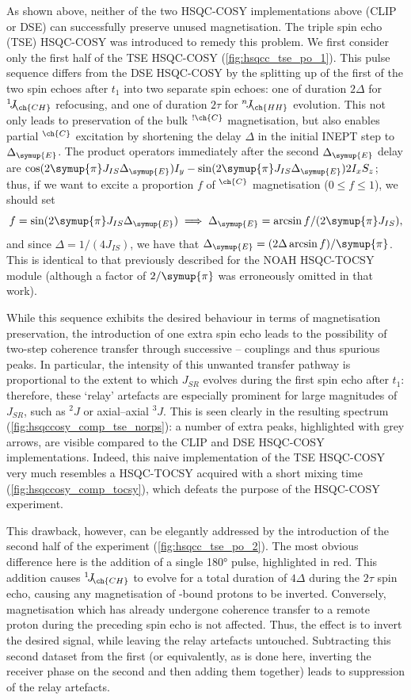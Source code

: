 \documentclass[a4paper,12pt]{article}
\newcommand{\proton}{\ch{^{1}H}}
\newcommand{\carbon}{\ch{^{13}C}}
\newcommand{\DeltaE}{\Delta_{\symup{E}}}
\newcommand{\HH}{\proton{}--\proton{}}
\newcommand{\magn}[1]{\ch{^1H}$^{\ch{#1}}$}
\newcommand{\magnnot}[1]{\ch{^1H}$^{!\ch{#1}}$}
\newcommand{\oneJ}[1]{{}^{1}\!J_{\!\ch{#1}}}
\newcommand{\nJ}[1]{{}^{n}\!J_{\!\ch{#1}}}
\newcommand{\cpi}{\symup{\pi}}
\begin{document}
\begin{refsection}
As shown above, neither of the two HSQC-COSY implementations above (CLIP or DSE) can successfully preserve unused magnetisation.
The triple spin echo (TSE) HSQC-COSY was introduced to remedy this problem.
We first consider only the first half of the TSE HSQC-COSY (\cref{fig:hsqcc_tse_po_1}).
This pulse sequence differs from the DSE HSQC-COSY by the splitting up of the first of the two spin echoes after $t_1$ into two separate spin echoes: one of duration $2\Delta$ for $\oneJ{CH}$ refocusing, and one of duration $2\tau$ for $\nJ{HH}$ evolution.
This not only leads to preservation of the bulk \magnnot{C} magnetisation, but also enables partial \magn{C} excitation by shortening the delay $\Delta$ in the initial INEPT step to $\DeltaE$.
The product operators immediately after the second $\DeltaE$ delay are $\cos(2\cpi J_{IS} \DeltaE) I_y - \sin(2\cpi J_{IS} \DeltaE) 2I_xS_z$; thus, if we want to excite a proportion $f$ of \magn{C} magnetisation ($0 \leq f \leq 1$), we should set
$$f = \sin(2\cpi J_{IS} \DeltaE) \implies \DeltaE = \arcsin{f}/(2\cpi J_{IS}),$$
and since $\Delta = 1/(4J_{IS})$, we have that $\DeltaE = (2\Delta \arcsin{f}) / \cpi$.
This is identical to that previously described for the NOAH HSQC-TOCSY module\autocite{Yong2021JMR} (although a factor of $2/\cpi$ was erroneously omitted in that work).

While this sequence exhibits the desired behaviour in terms of magnetisation preservation, the introduction of one extra spin echo leads to the possibility of two-step coherence transfer through successive \HH{} couplings and thus spurious peaks.
In particular, the intensity of this unwanted transfer pathway is proportional to the extent to which $J_{SR}$ evolves during the first spin echo after $t_1$: therefore, these `relay' artefacts are especially prominent for large magnitudes of $J_{SR}$, such as $^2\!J$ or axial--axial $^3\!J$.
This is seen clearly in the resulting spectrum (\cref{fig:hsqccosy_comp_tse_norps}): a number of extra peaks, highlighted with grey arrows, are visible compared to the CLIP and DSE HSQC-COSY implementations.
Indeed, this naive implementation of the TSE HSQC-COSY very much resembles a HSQC-TOCSY acquired with a short mixing time (\cref{fig:hsqccosy_comp_tocsy}), which defeats the purpose of the HSQC-COSY experiment.

This drawback, however, can be elegantly addressed by the introduction of the second half of the experiment (\cref{fig:hsqcc_tse_po_2}).
The most obvious difference here is the addition of a single \carbon{} \ang{180} pulse, highlighted in red.
This addition causes $\oneJ{CH}$ to evolve for a total duration of $4\Delta$ during the $2\tau$ spin echo, causing any magnetisation of \carbon{}-bound protons to be inverted.
Conversely, magnetisation which has already undergone coherence transfer to a remote proton during the preceding spin echo is not affected.
Thus, the effect is to invert the desired signal, while leaving the relay artefacts untouched.
Subtracting this second dataset from the first (or equivalently, as is done here, inverting the receiver phase on the second and then adding them together) leads to suppression of the relay artefacts.


\end{refsection}
\end{document}
